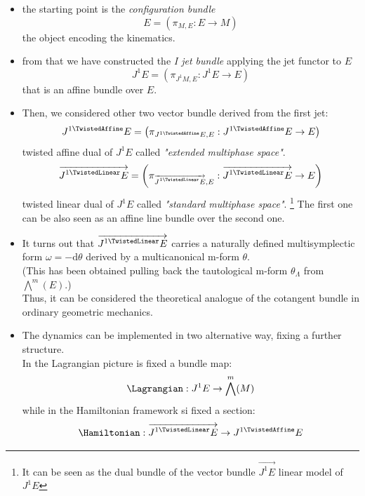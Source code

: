 \documentclass[a4paper,12pt]{scrartcl}  %
\renewcommand{\AffDualJet}{ J^{1 \TwistedAffine}E }
\renewcommand{\LinDualJet}{ \overrightarrow{J^{1 \TwistedLinear}E} }
\begin{document}
\begin{itemize}
 \item the starting point is the \emph{configuration bundle} 
 	\begin{displaymath}
 		E = \left( \pi_{M,E} : E\rightarrow M \right)
 	\end{displaymath}
 	the object encoding the kinematics.
 \item from that we have constructed the \emph{I jet bundle} applying the jet functor to $E$ 
 	\begin{displaymath}
 	J^1E = \left( \pi_{J^1 M,E} : J^1 E\rightarrow E \right)
 	\end{displaymath} 
 	that is an affine bundle over $E$.
 \item Then, we considered other two vector bundle derived from the first jet:
 	\begin{displaymath}
 	\AffDualJet  = \left( \pi_{ \AffDualJet ,E} : \AffDualJet  \rightarrow E \right)
 	\end{displaymath}
	twisted affine dual of $J^1E$ called \emph{"extended multiphase space"}.
	\begin{displaymath}
		\LinDualJet  = \left( \pi_{ \LinDualJet ,E} : \LinDualJet \rightarrow E \right)
	\end{displaymath}
	twisted linear dual of $J^1 E$ called \emph{"standard multiphase space"}. \footnote{It can be seen as the dual bundle of the vector bundle $\vec{J^1E}$ linear model of $J^1E$}
	The first one can be also seen as an affine line bundle over the second one.
	
\item It turns out that  $\LinDualJet $ carries a naturally defined multisymplectic form $\omega = -\textrm{d} \theta$ derived by a multicanonical m-form $\theta$. \\
	(This has been obtained pulling back the tautological m-form $\theta_\Lambda$ from $\bigwedge^m (E)$.) \\
	Thus, it can be considered the theoretical analogue of the cotangent bundle in ordinary geometric mechanics.
	
\item The dynamics can be implemented in two alternative way, fixing a further structure.\\
	In the Lagrangian picture is fixed a bundle map:
	\begin{displaymath}
		\Lagrangian : J^1 E \rightarrow \bigwedge^m (M)
	\end{displaymath}
	while in the Hamiltonian framework si fixed a section:
	\begin{displaymath}
		\Hamiltonian : \LinDualJet \rightarrow \AffDualJet
	\end{displaymath}


\end{itemize}
\end{document}
